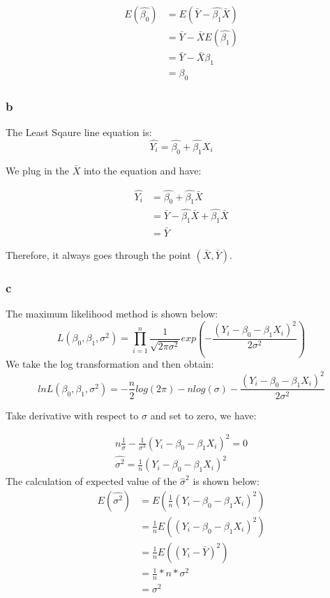 \documentclass[]{article}
\begin{document}
\[
\begin{aligned}
E(\hat{\beta_{0}}) &= E(\bar{Y} - \hat{\beta_{1}}\bar{X}) \\
&=\bar{Y} - \bar{X}E(\hat{\beta_{1}})\\
&=\bar{Y} - \bar{X}\beta_{1}\\
&=\beta_{0}
\end{aligned}
\]

\subsubsection{b}\label{b}

The Least Sqaure line equation is: \[
\hat{Y_{i} }= \hat{\beta_{0}} + \hat{\beta_{1}}X_{i}
\]

We plug in the \(\bar{X}\) into the equation and have:

\[
\begin{aligned}
\hat{Y_{i} } &= \hat{\beta_{0}} + \hat{\beta_{1}}\bar{X} \\
&= \bar{Y} - \hat{\beta_{1}}\bar{X} + \hat{\beta_{1}}\bar{X} \\
&= \bar{Y}
\end{aligned}
\]

Therefore, it always goes through the point \((\bar{X}, \bar{Y})\).

\subsubsection{c}\label{c}

The maximum likelihood method is shown below: \[
L(\beta_{0}, \beta_{1}, \sigma^2) = \prod_{i=1}^{n} \frac{1}{\sqrt{2\pi\sigma^2}}exp(-\frac{(Y_{i} - \beta_{0} - \beta_{1}X_{i})^2}{2\sigma^2})
\] We take the log transformation and then obtain: \[
ln L(\beta_{0}, \beta_{1}, \sigma^2) = -\frac{n}{2}log(2\pi) - nlog(\sigma)
-\frac{(Y_{i} - \beta_{0} - \beta_{1}X_{i})^2}{2\sigma^2}
\]

Take derivative with respect to \(\sigma\) and set to zero, we have:

\[
\begin{align}
n\frac{1}{\sigma} - \frac{1}{\sigma^3}(Y_{i} - \beta_{0} - \beta_{1}X_{i})^2 = 0\\
\hat{\sigma^2} = \frac{1}{n}(Y_{i} - \beta_{0} - \beta_{1}X_{i})^2
\end{align}
\] The calculation of expected value of the \(\hat{\sigma}^2\) is shown
below: \[
\begin{align}
E(\hat{\sigma^2}) &= E( \frac{1}{n}(Y_{i} - \beta_{0} - \beta_{1}X_{i})^2)\\
&= \frac{1}{n}E((Y_{i} - \beta_{0} - \beta_{1}X_{i})^2)\\
&= \frac{1}{n}E((Y_{i} - \bar{Y})^2)\\
&= \frac{1}{n}*n*\sigma^2 \\
&= \sigma^2
\end{align} 
\]
\end{document}

